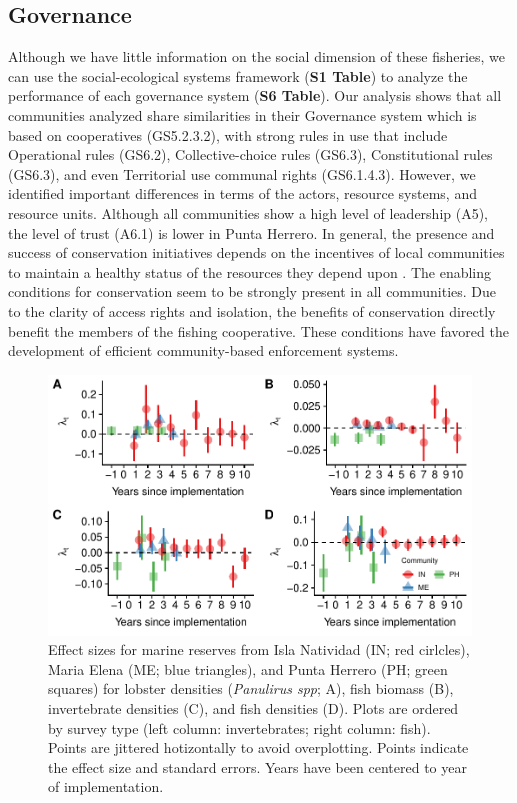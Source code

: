 \documentclass{frontiersSCNS}
\theoremstyle{definition}
\theoremstyle{definition}
\theoremstyle{definition}
\theoremstyle{remark}
\begin{document}
\subsection{Governance}\label{governance}

Although we have little information on the social dimension of these
fisheries, we can use the social-ecological systems framework
(\textbf{S1 Table}) to analyze the performance of each governance system
(\textbf{S6 Table}). Our analysis shows that all communities analyzed
share similarities in their Governance system which is based on
cooperatives (GS5.2.3.2), with strong rules in use that include
Operational rules (GS6.2), Collective-choice rules (GS6.3),
Constitutional rules (GS6.3), and even Territorial use communal rights
(GS6.1.4.3). However, we identified important differences in terms of
the actors, resource systems, and resource units. Although all
communities show a high level of leadership (A5), the level of trust
(A6.1) is lower in Punta Herrero. In general, the presence and success
of conservation initiatives depends on the incentives of local
communities to maintain a healthy status of the resources they depend
upon \citep{jupiter_2017}. The enabling conditions for conservation seem
to be strongly present in all communities. Due to the clarity of access
rights and isolation, the benefits of conservation directly benefit the
members of the fishing cooperative. These conditions have favored the
development of efficient community-based enforcement systems.

\clearpage

\begin{figure}
\centering
\includegraphics{Villasenor-Derbez_files/figure-latex/unnamed-chunk-4-1.pdf}
\caption{\label{fig:unnamed-chunk-4}\label{fig:indicators}Effect sizes for
marine reserves from Isla Natividad (IN; red cirlcles), Maria Elena (ME;
blue triangles), and Punta Herrero (PH; green squares) for lobster
densities (\emph{Panulirus spp}; A), fish biomass (B), invertebrate
densities (C), and fish densities (D). Plots are ordered by survey type
(left column: invertebrates; right column: fish). Points are jittered
hotizontally to avoid overplotting. Points indicate the effect size and
standard errors. Years have been centered to year of implementation.}
\end{figure}
\end{document}
